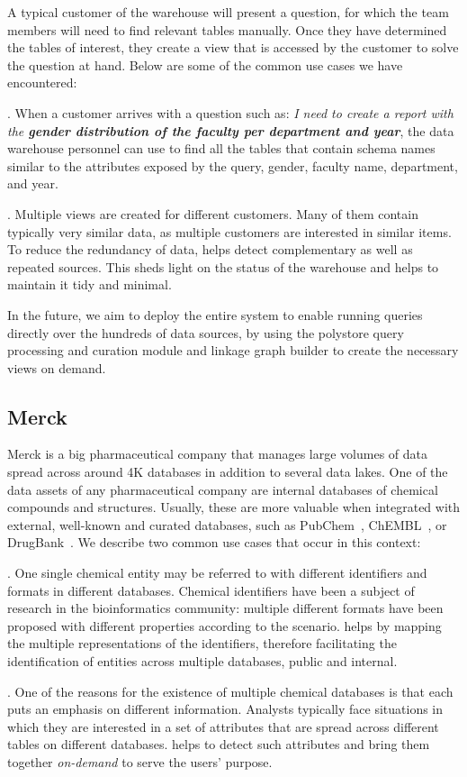 A typical customer of the warehouse will present a question, for which the team members will need to find relevant tables manually. Once they have determined the tables of interest, they create a view that is accessed by the customer to solve the question at hand. Below are some of the common use cases we have encountered:

. When a customer arrives with a question such as: \emph{I need to create a report with the \textbf{gender distribution of the faculty per department and year}}, the data warehouse personnel can use \dcv to find all the tables that contain schema names similar to the attributes exposed by the query, \eg gender, faculty name, department, and year.

. Multiple views are created for different customers. Many of them contain typically very similar data, as multiple customers are interested in similar items. To reduce the redundancy of data, \dcv helps  detect complementary as well as repeated sources. This sheds light on the status of the warehouse and helps to maintain it tidy and minimal.

In the future, we aim to deploy the entire \dcv system to enable running queries directly over the hundreds of data sources, by using the polystore query processing and curation module and linkage graph builder to create the necessary views on demand. 

\subsection{Merck}


Merck is a big pharmaceutical company that manages large volumes of data spread across around 4K databases in addition to several data lakes. 
One of the data assets of any pharmaceutical company are internal databases of chemical compounds and structures. Usually, these are more valuable when integrated with external, well-known and curated databases, such as PubChem~\cite{pubchem}, ChEMBL~\cite{ChEMBL}, or DrugBank~\cite{DrugBank}. We describe two common use cases that occur in this context:


. One single chemical entity may be referred to with different identifiers and formats in different databases. Chemical identifiers have been a subject of research in the bioinformatics community: multiple different formats have been proposed with different properties according to the scenario. \dcv helps by mapping the multiple representations of the identifiers, therefore facilitating the identification of entities across multiple databases, public and internal.



. One of the reasons for the existence of multiple chemical databases is that each puts an emphasis on different information. Analysts typically face situations in which they are interested in a set of attributes that are spread across different tables on different databases. \dcv helps to detect such attributes and bring them together \emph{on-demand}  to serve the users' purpose.

